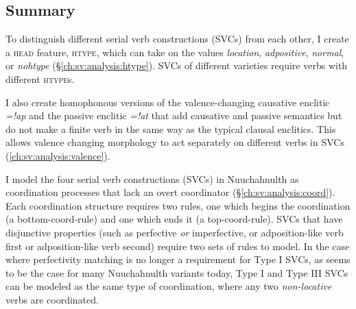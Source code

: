 \subsection{Summary}

To distinguish different serial verb constructions (SVCs) from each other, I create a \textsc{head} feature, \textsc{htype}, which can take on the values \textit{location}, \textit{adpositive}, \textit{normal}, or \textit{nohtype} (\S\ref{ch:sv:analysis:htype}). SVCs of different varieties require verbs with different \textsc{htype}s.

I also create homophonous versions of the valence-changing causative enclitic \textit{=!ap} and the passive enclitic \textit{=!at} that add causative and passive semantics but do not make a finite verb in the same way as the typical clausal enclitics. This allows valence changing morphology to act separately on different verbs in SVCs (\ref{ch:sv:analysis:valence}).

I model the four serial verb constructions (SVCs) in Nuuchahnulth as coordination processes that lack an overt coordinator (\S\ref{ch:sv:analysis:coord}). Each coordination structure requires two rules, one which begins the coordination (a bottom-coord-rule) and one which ends it (a top-coord-rule). SVCs that have disjunctive properties (such as perfective \textit{or} imperfective, or adposition-like verb first or adposition-like verb second) require two sets of rules to model. In the case where perfectivity matching is no longer a requirement for Type I SVCs, as seems to be the case for many Nuuchahnulth variants today, Type I and Type III SVCs can be modeled as the same type of coordination, where any two \textit{non-locative} verbs are coordinated.